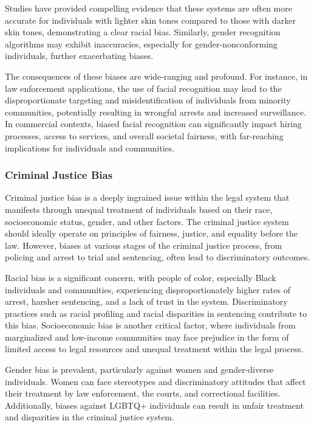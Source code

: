\documentclass[12pt,a4paper,openright,twoside]{book}
\begin{document}
Studies have provided compelling evidence that these systems are often more accurate for individuals with lighter skin tones compared to those with darker skin tones, demonstrating a clear racial bias. Similarly, gender recognition algorithms may exhibit inaccuracies, especially for gender-nonconforming individuals, further exacerbating biases. 

The consequences of these biases are wide-ranging and profound. For instance, in law enforcement applications, the use of facial recognition may lead to the disproportionate targeting and misidentification of individuals from minority communities, potentially resulting in wrongful arrests and increased surveillance. In commercial contexts, biased facial recognition can significantly impact hiring processes, access to services, and overall societal fairness, with far-reaching implications for individuals and communities.


\subsubsection{Criminal Justice Bias}
Criminal justice bias is a deeply ingrained issue within the legal system that manifests through unequal treatment of individuals based on their race, socioeconomic status, gender, and other factors. The criminal justice system should ideally operate on principles of fairness, justice, and equality before the law. However, biases at various stages of the criminal justice process, from policing and arrest to trial and sentencing, often lead to discriminatory outcomes. \cite{doi:10.1080/10345329.2019.1658694} 

Racial bias is a significant concern, with people of color, especially Black individuals and communities, experiencing disproportionately higher rates of arrest, harsher sentencing, and a lack of trust in the system. Discriminatory practices such as racial profiling and racial disparities in sentencing contribute to this bias. Socioeconomic bias is another critical factor, where individuals from marginalized and low-income communities may face prejudice in the form of limited access to legal resources and unequal treatment within the legal process. \cite{9660177}  

Gender bias is prevalent, particularly against women and gender-diverse individuals. Women can face stereotypes and discriminatory attitudes that affect their treatment by law enforcement, the courts, and correctional facilities. Additionally, biases against LGBTQ+ individuals can result in unfair treatment and disparities in the criminal justice system. \cite{gebru2020race} 
\end{document}
